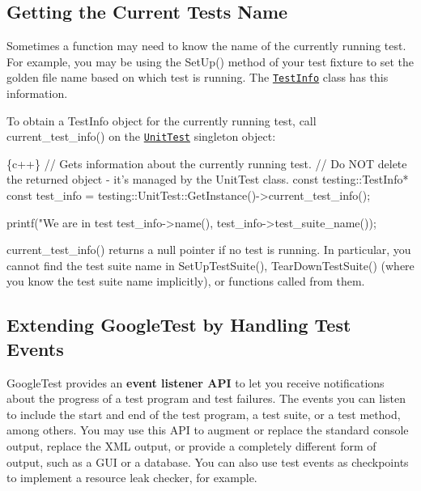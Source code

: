 \subsection*{Getting the Current Test\textquotesingle{}s Name}

Sometimes a function may need to know the name of the currently running test. For example, you may be using the {\ttfamily Set\+Up()} method of your test fixture to set the golden file name based on which test is running. The \href{reference/testing.md#TestInfo}{\tt {\ttfamily Test\+Info}} class has this information.

To obtain a {\ttfamily Test\+Info} object for the currently running test, call {\ttfamily current\+\_\+test\+\_\+info()} on the \href{reference/testing.md#UnitTest}{\tt {\ttfamily Unit\+Test}} singleton object\+:


\begin{DoxyCode}
\{c++\}
  // Gets information about the currently running test.
  // Do NOT delete the returned object - it's managed by the UnitTest class.
  const testing::TestInfo* const test\_info =
      testing::UnitTest::GetInstance()->current\_test\_info();

  printf("We are in test %
         test\_info->name(),
         test\_info->test\_suite\_name());
\end{DoxyCode}


{\ttfamily current\+\_\+test\+\_\+info()} returns a null pointer if no test is running. In particular, you cannot find the test suite name in {\ttfamily Set\+Up\+Test\+Suite()}, {\ttfamily Tear\+Down\+Test\+Suite()} (where you know the test suite name implicitly), or functions called from them.

\subsection*{Extending Google\+Test by Handling Test Events}

Google\+Test provides an {\bfseries event listener A\+PI} to let you receive notifications about the progress of a test program and test failures. The events you can listen to include the start and end of the test program, a test suite, or a test method, among others. You may use this A\+PI to augment or replace the standard console output, replace the X\+ML output, or provide a completely different form of output, such as a G\+UI or a database. You can also use test events as checkpoints to implement a resource leak checker, for example.

